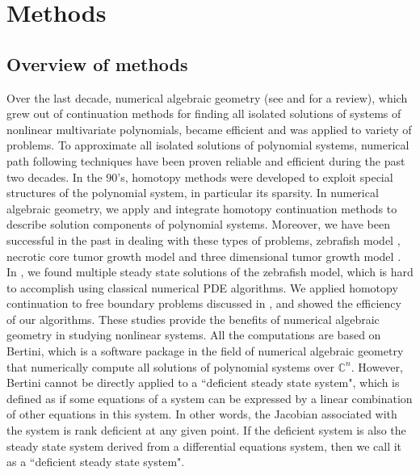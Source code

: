 \section*{Methods}
\label{sec:method}
\subsection*{Overview of methods}
Over the last decade, numerical algebraic geometry (see \cite{Li}
and \cite{SW} for a review), which grew out of continuation methods
for finding all isolated solutions of systems of nonlinear
multivariate polynomials, became efficient and was applied to
variety of problems. To approximate all isolated solutions of
polynomial systems, numerical path following techniques have been
proven reliable and efficient during the past two decades. In the
90's, homotopy methods were developed to exploit special structures
of the polynomial system, in particular its sparsity. In numerical
algebraic geometry, we apply and integrate homotopy continuation
methods to describe solution components of polynomial systems.
Moreover, we have been successful in the past in dealing with these
types of problems, zebrafish model \cite{HHHLSZ}, necrotic core
tumor growth model \cite{HHHLSZ2} and three dimensional tumor growth
model \cite{HHHS}. In \cite{HHHLSZ2}, we found multiple steady state
solutions of the zebrafish model, which is hard to accomplish using
classical numerical PDE algorithms. We applied homotopy continuation
to free boundary problems discussed in \cite{HHHLSZ2, HHHS},  and
showed the efficiency of our algorithms. These studies provide the
benefits of numerical algebraic geometry in studying nonlinear
systems. All the computations are based on Bertini\texttrademark \cite{Bertini,BertiniBook},
which is a software package in the field of numerical algebraic
geometry that numerically compute all solutions of polynomial
systems over $\mathbb{C}^n$. However, Bertini cannot be directly
applied to a ``deficient steady state system", which is defined as
if some equations of a system can be expressed by a linear
combination of other equations in this system. In other words, the
Jacobian associated with the system is rank deficient at any given
point. If the deficient system is also the steady state system
derived from a differential equations system, then we call it as a
``deficient steady state system".

